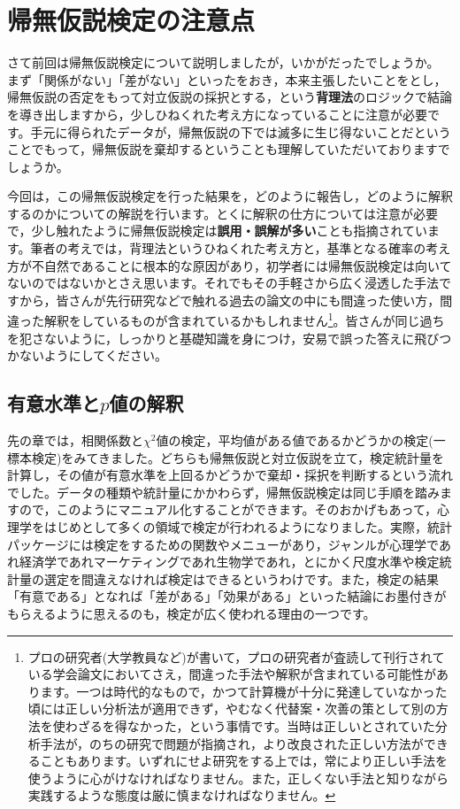 \documentclass{ltjsbook}
\begin{document}
\chapter{帰無仮説検定の注意点}
\label{ch14_NHST2}
さて前回は帰無仮説検定について説明しましたが，いかがだったでしょうか。
まず「関係がない」「差がない」といったをおき，本来主張したいことをとし，帰無仮説の否定をもって対立仮説の採択とする，という\textbf{背理法}のロジックで結論を導き出しますから，少しひねくれた考え方になっていることに注意が必要です。手元に得られたデータが，帰無仮説の下では滅多に生じ得ないことだということでもって，帰無仮説を棄却するということも理解していただいておりますでしょうか。

今回は，この帰無仮説検定を行った結果を，どのように報告し，どのように解釈するのかについての解説を行います。とくに解釈の仕方については注意が必要で，少し触れたように帰無仮説検定は\textbf{誤用・誤解が多い}ことも指摘されています。筆者の考えでは，背理法というひねくれた考え方と，基準となる確率の考え方が不自然であることに根本的な原因があり，初学者には帰無仮説検定は向いてないのではないかとさえ思います。それでもその手軽さから広く浸透した手法ですから，皆さんが先行研究などで触れる過去の論文の中にも間違った使い方，間違った解釈をしているものが含まれているかもしれません\footnote{プロの研究者(大学教員など)が書いて，プロの研究者が査読して刊行されている学会論文においてさえ，間違った手法や解釈が含まれている可能性があります。一つは時代的なもので，かつて計算機が十分に発達していなかった頃には正しい分析法が適用できず，やむなく代替案・次善の策として別の方法を使わざるを得なかった，という事情です。当時は正しいとされていた分析手法が，のちの研究で問題が指摘され，より改良された正しい方法ができることもあります。いずれにせよ研究をする上では，常により正しい手法を使うように心がけなければなりません。また，正しくない手法と知りながら実践するような態度は厳に慎まなければなりません。}。皆さんが同じ過ちを犯さないように，しっかりと基礎知識を身につけ，安易で誤った答えに飛びつかないようにしてください。

\section{有意水準と$p$値の解釈}

先の章では，相関係数と$\chi^2$値の検定，平均値がある値であるかどうかの検定(一標本検定)をみてきました。どちらも帰無仮説と対立仮説を立て，検定統計量を計算し，その値が有意水準を上回るかどうかで棄却・採択を判断するという流れでした。データの種類や統計量にかかわらず，帰無仮説検定は同じ手順を踏みますので，このようにマニュアル化することができます。そのおかげもあって，心理学をはじめとして多くの領域で検定が行われるようになりました。実際，統計パッケージには検定をするための関数やメニューがあり，ジャンルが心理学であれ経済学であれマーケティングであれ生物学であれ，とにかく尺度水準や検定統計量の選定を間違えなければ検定はできるというわけです。また，検定の結果「有意である」となれば「差がある」「効果がある」といった結論にお墨付きがもらえるように思えるのも，検定が広く使われる理由の一つです。
\end{document}
